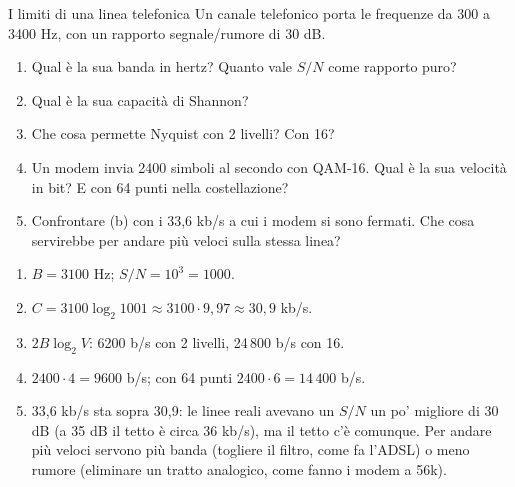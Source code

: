 \begin{esercizio}{I limiti di una linea telefonica}
Un canale telefonico porta le frequenze da 300 a 3400 Hz, con un rapporto segnale/rumore di 30 dB.
\begin{enumerate}[label=(\alph*)]
    \item Qual è la sua banda in hertz? Quanto vale $S/N$ come rapporto puro?
    \item Qual è la sua capacità di Shannon?
    \item Che cosa permette Nyquist con 2 livelli? Con 16?
    \item Un modem invia 2400 simboli al secondo con QAM-16. Qual è la sua velocità in bit? E con 64 punti nella costellazione?
    \item Confrontare (b) con i 33,6 kb/s a cui i modem si sono fermati. Che cosa servirebbe per andare più veloci sulla stessa linea?
\end{enumerate}

\svolgimento
\begin{enumerate}[label=(\alph*)]
    \item $B = 3100$ Hz; $S/N = 10^3 = 1000$.
    \item $C = 3100 \log_2 1001 \approx 3100 \cdot 9{,}97 \approx 30{,}9$ kb/s.
    \item $2B \log_2 V$: 6200 b/s con 2 livelli, 24\,800 b/s con 16.
    \item $2400 \cdot 4 = 9600$ b/s; con 64 punti $2400 \cdot 6 = 14\,400$ b/s.
    \item 33,6 kb/s sta sopra 30,9: le linee reali avevano un $S/N$ un po' migliore di 30 dB (a 35 dB il tetto è circa 36 kb/s), ma il
          tetto c'è comunque. Per andare più veloci servono più banda (togliere il filtro, come fa l'ADSL) o meno rumore (eliminare un tratto
          analogico, come fanno i modem a 56k).
\end{enumerate}
\end{esercizio}

